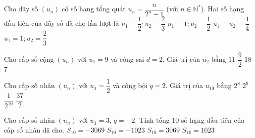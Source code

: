 \begin{ex}%
Cho dãy số $\left(u_n\right)$ có số hạng tổng quát $u_n=\dfrac{n}{2^n-1}$ (với $n\in{\mathbb{N}^{*}}$). Hai số hạng đầu tiên của dãy số đã cho lần lượt là
\choice
{$u_1=\dfrac{1}{2};u_2=\dfrac{2}{3}$}
{$u_1=1;u_2=\dfrac{1}{2}$}
{$u_1=u_2=\dfrac{1}{4}$}
{\True $u_1=1;u_2=\dfrac{2}{3}$}
\end{ex}
\begin{ex}%
Cho cấp số cộng $\left(u_n\right)$ với $u_1=9$ và công sai $d=2$. Giá trị của $u_2$ bằng
\choice
{\True $11$}
{$\dfrac{9}{2}$}
{$18$}
{$7$}
\end{ex}
\begin{ex}%
Cho cấp số nhân $\left(u_n\right)$ với $u_1=\dfrac{1}{2}$ và công bội $q=2$. Giá trị của $u_{10}$ bằng
\choice
{\True $2^8$}
{$2^9$}
{$\dfrac{1}{2^{10}}$}
{$\dfrac{37}{2}$}
\end{ex}
\begin{ex}%
Cho cấp số nhân $\left(u_n\right)$ với $u_1=3$, $q=-2$. Tính tổng $10$ số hạng đầu tiên của cấp số nhân đã cho.
\choice
{$S_{10}=-3069$}
{\True $S_{10}=-1023$}
{$S_{10}=3069$}
{$S_{10}=1023$}
\end{ex}

